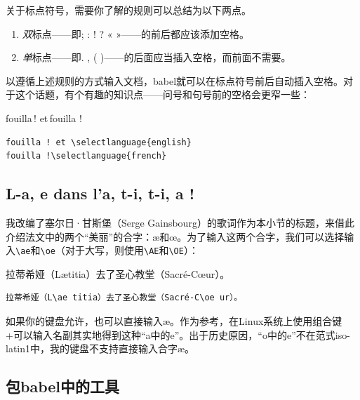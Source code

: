 关于标点符号，需要你了解的规则可以总结为以下两点。

\begin{enumerate}
    \item \emph{双}标点——即; : ! ? « »——的前后都应该添加空格。
    \item \emph{单}标点——即. , ( )——的后面应当插入空格，而前面不需要。
\end{enumerate}

以遵循上述规则的方式输入文档，\textsf{babel}就可以在标点符号前后自动插入空格。对于这个话题，有个有趣的知识点——问号和句号前的空格会更窄一些：

\begin{codelist}[7.1]{
    fouilla\,! et\enspace\,fouilla !
}\begin{verbatim}
fouilla ! et \selectlanguage{english}
fouilla !\selectlanguage{french}
\end{verbatim}
\end{codelist}

\subsection{L-a, e dans l'a, t-i, t-i, a !}

我改编了塞尔日·甘斯堡（Serge Gainsbourg）的歌词作为本小节的标题，来借此介绍法文中的两个“美丽”的合字：æ和œ。为了输入这两个合字，我们可以选择输入\verb|\ae|和\verb+\oe+（对于大写，则使用\verb|\AE|和\verb+\OE+）：

\begin{codelist}[7.2]{
    拉蒂希娅（L\ae titia）去了圣心教堂（Sacré-C\oe ur）。
}\begin{verbatim}
拉蒂希娅（L\ae titia）去了圣心教堂（Sacré-C\oe ur）。
\end{verbatim}
\end{codelist}

如果你的键盘允许，也可以直接输入æ。作为参考，在Linux系统上使用组合键+可以输入名副其实地得到这种“a中的e”。出于历史原因，“o中的e”不在范式iso-latin1中，我的键盘不支持直接输入合字æ。

\subsection{包\textsf{babel}中的工具}

